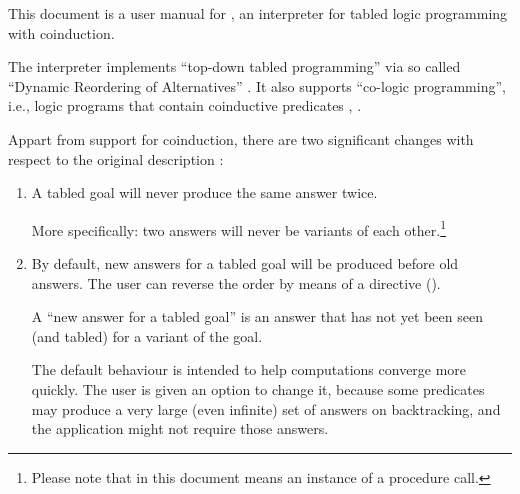 
This document is a user manual for , an interpreter for tabled
logic programming with coinduction.

The interpreter implements ``top-down tabled programming'' via so called
``Dynamic Reordering of Alternatives'' \cite{guo-gupta-dra}.  It also
supports ``co-logic programming'', i.e., logic programs that contain
coinductive predicates \cite{coinductive}, \cite{co-LP}.

Appart from support for coinduction, there are two significant changes with
respect to the original description \cite{guo-gupta-dra}:
\begin{enumerate}

\item A tabled goal will never produce the same answer twice.

  More specifically: two answers will never be variants of each
  other.\footnote{
  Please note that in this document  means an instance of a
  procedure call.}

\item By default, new answers for a tabled goal will be produced before old
  answers.  The user can reverse the order by means of a directive
  ().

  A ``new answer for a tabled goal'' is an answer that has not yet been seen
  (and tabled) for a variant of the goal.

  The default behaviour is intended to help computations converge more
  quickly.  The user is given an option to change it, because some predicates
  may produce a very large (even infinite) set of answers on backtracking,
  and the application might not require those answers.
\end{enumerate}
